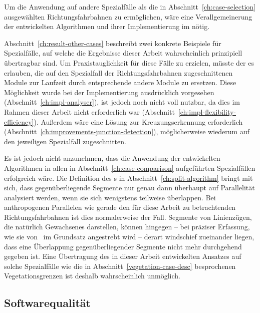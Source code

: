 \documentclass[../main/thesis.tex]{subfiles}
\begin{document}
Um die Anwendung auf andere Spezialfälle als die in Abschnitt~\ref{ch:case-selection} ausgewählten Richtungsfahrbahnen zu ermöglichen, wäre eine Verallgemeinerung der entwickelten Algorithmen und ihrer Implementierung im  nötig.

Abschnitt~\ref{ch:result-other-cases} beschreibt zwei konkrete Beispiele für Spezialfälle, auf welche die Ergebnisse dieser Arbeit wahrscheinlich prinzipiell übertragbar sind.
Um Praxistauglichkeit für diese Fälle zu erzielen, müsste der  es erlauben, die auf den Spezialfall der Richtungsfahrbahnen zugeschnittenen Module zur Laufzeit durch entsprechende andere Module zu ersetzen.
Diese Möglichkeit wurde bei der Implementierung ausdrücklich vorgesehen (Abschnitt~\ref{ch:impl-analyser}), ist jedoch noch nicht voll nutzbar, da dies im Rahmen dieser Arbeit nicht erforderlich war (Abschnitt~\ref{ch:impl-flexibility-efficiency}).
Außerdem wäre eine Lösung zur Kreuzungserkennung erforderlich (Abschnitt~\ref{ch:improvements-junction-detection}), möglicherweise wiederum auf den jeweiligen Spezialfall zugeschnitten.

Es ist jedoch nicht anzunehmen, dass die Anwendung der entwickelten Algorithmen in allen in Abschnitt~\ref{ch:case-comparison} aufgeführten Spezialfällen erfolgreich wäre.
Die Definition des s in Abschnitt~\ref{ch:split-algorithm} bringt mit sich, dass gegenüberliegende Segmente nur genau dann überhaupt auf Parallelität analysiert werden, wenn sie sich wenigstens teilweise überlappen.
Bei anthropogenen Parallelen wie gerade den für diese Arbeit zu betrachtenden Richtungsfahrbahnen ist dies normalerweise der Fall.
Segmente von Linienzügen, die natürlich Gewachsenes darstellen, können hingegen -- bei präziser Erfassung, wie sie von \osm\ im Grundsatz angestrebt wird -- derart windschief zueinander liegen, dass eine Überlappung gegenüberliegender Segmente nicht mehr durchgehend gegeben ist.
Eine Übertragung des in dieser Arbeit entwickelten Ansatzes auf solche Spezialfälle wie die in Abschnitt~\ref{vegetation-case-desc} besprochenen Vegetationsgrenzen ist deshalb wahrscheinlich unmöglich.




\subsection{Softwarequalität}
\label{ch:improvements-software}
\end{document}
